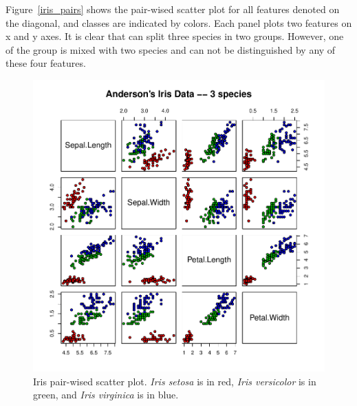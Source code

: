 Figure~\ref{iris_pairs} shows the pair-wised scatter plot for all features
denoted on the diagonal, and classes are indicated by colors. Each panel
plots two features on x and y axes. It is clear
that  can split three species in two groups. However,
one of the group is mixed with two species and can not be distinguished by
any of these four features.
\begin{figure}[h!bt]
  \centering
  \includegraphics[width=6.5in]{pbdDEMO-include/pics/iris_pairs.pdf}
  \vspace{-1.5cm}
  \caption[Iris pair-wised scatter plot]{
    Iris pair-wised scatter plot. {\it Iris setosa} is in red,
    {\it Iris versicolor} is in green, and {\it Iris virginica} is in blue.
  }
  \label{fig:iris_pairs}
\end{figure}



